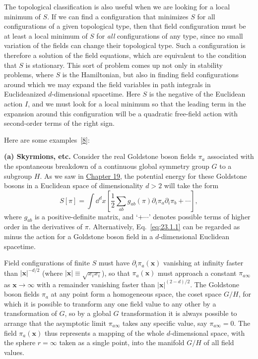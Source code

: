 The topological classification is also useful when we are looking for a
local minimum of $S$. If we can find a configuration that minimizes $S$ for
all configurations of a given topological type, then that field
configuration must be at least a local minimum of $S$ for \emph{all}
configurations of any type, since no small variation of the fields can
change their topological type. Such a configuration is therefore a solution
of the field equations, which are equivalent to the condition that $S$ is
stationary. This sort of problem comes up not only in stability problems,
where $S$ is the Hamiltonian, but also in finding field configurations
around which we may expand the field variables in path integrals in
Euclideanized $d$-dimensional spacetime. Here $S$ is the negative of the
Euclidean action $I$, and we must look for a local minimum so that the
leading term in the expansion around this configuration will be a quadratic
free-field action with second-order terms of the right sign.

Here are some examples~\hyperref[ch23-ref-8]{[8]}:

\noindent\textbf{(a) Skyrmions, etc.} Consider the real Goldstone boson
fields $\pi_a$ associated with the spontaneous breakdown of a continuous
global symmetry group $G$ to a subgroup $H$. As we saw in
\hyperref[sec:19.4]{Chapter 19}, the potential energy for these Goldstone
bosons in a Euclidean space of dimensionality $d>2$ will take the form
\begin{equation}
 S[\pi]=\int \dd^d x\left[
  \frac{1}{2}\sum_{ab}g_{ab}(\pi)
  \partial_i\pi_a\partial_i\pi_b+\cdots
 \right],
 \tag{23.1.1}\label{eq:23.1.1}
\end{equation}
where $g_{ab}$ is a positive-definite matrix, and `$+\cdots$' denotes
possible terms of higher order in the derivatives of $\pi$. Alternatively,
Eq.~\eqref{eq:23.1.1} can be regarded as minus the action for a Goldstone
boson field in a $d$-dimensional Euclidean spacetime.

Field configurations of finite $S$ must have
$\partial_i\pi_a(\mathbf{x})$ vanishing at infinity faster than
$|\mathbf{x}|^{-d/2}$ (where $|\mathbf{x}|\equiv\sqrt{x_ix_i}$), so that
$\pi_a(\mathbf{x})$ must approach a constant $\pi_{a\infty}$ as
$\mathbf{x}\to\infty$ with a remainder vanishing faster than
$|\mathbf{x}|^{(2-d)/2}$. The Goldstone boson fields $\pi_a$ at any point
form a homogeneous space, the coset space $G/H$, for which it is possible
to transform any one field value to any other by a transformation of $G$,
so by a global $G$ transformation it is always possible to arrange that the
asymptotic limit $\pi_{a\infty}$ takes any specific value, say
$\pi_{a\infty}=0$. The field $\pi_a(\mathbf{x})$ thus represents a mapping
of the whole $d$-dimensional space, with the sphere $r=\infty$ taken as a
single point, into the manifold $G/H$ of all field values.

